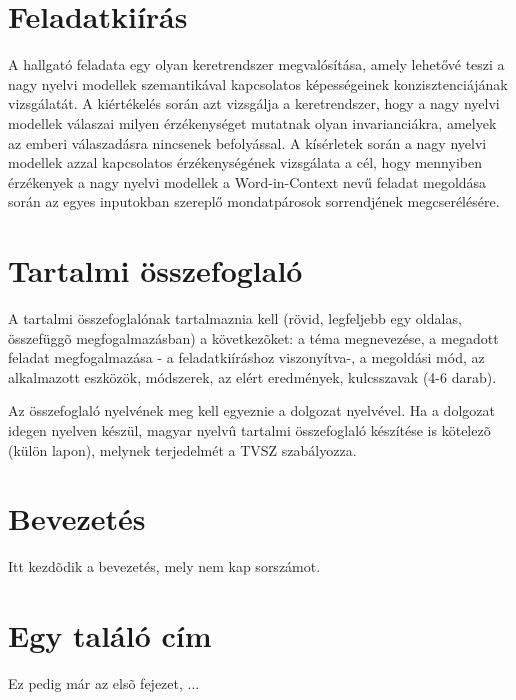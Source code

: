 \documentclass[12pt]{report}
\theoremstyle{definition}
\begin{document}
\chapter*{Feladatkiírás}


A hallgató feladata egy olyan keretrendszer megvalósítása, amely lehetővé teszi a nagy nyelvi modellek szemantikával kapcsolatos képességeinek konzisztenciájának vizsgálatát. A kiértékelés során azt vizsgálja a keretrendszer, hogy a nagy nyelvi modellek válaszai milyen érzékenységet mutatnak olyan invarianciákra, amelyek az emberi válaszadásra nincsenek befolyással. A kísérletek során a nagy nyelvi modellek azzal kapcsolatos érzékenységének vizsgálata a cél, hogy mennyiben érzékenyek a nagy nyelvi modellek a Word-in-Context nevű feladat megoldása során az egyes inputokban szereplő mondatpárosok sorrendjének megcserélésére.

\chapter*{Tartalmi összefoglaló}

A tartalmi összefoglalónak tartalmaznia kell (rövid, legfeljebb egy oldalas, összefüggõ megfogalmazásban)
a következõket: a téma megnevezése, a megadott feladat megfogalmazása - a feladatkiíráshoz viszonyítva-,
a megoldási mód, az alkalmazott eszközök, módszerek, az elért eredmények, kulcsszavak (4-6 darab).

Az összefoglaló nyelvének meg kell egyeznie a dolgozat nyelvével. Ha a dolgozat idegen nyelven készül,
magyar nyelvû tartalmi összefoglaló készítése is kötelezõ (külön lapon), melynek terjedelmét a TVSZ szabályozza.


\chapter*{Bevezetés}

Itt kezdõdik a bevezetés, mely nem kap sorszámot.



\chapter{Egy találó cím}

Ez pedig már az elsõ fejezet, ...
\end{document}
